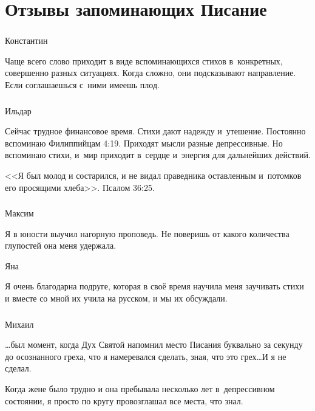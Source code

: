 \documentclass[t,aspectratio=169,14pt]{beamer}  %
\def\hy#1{\parbox{\linewidth}{#1}} %
\begin{document}
\section{Отзывы запоминающих Писание}
\begin{frame}[c]
	\frametitle{\insertsection}
	\framesubtitle{\insertsubsection}

	\begin{block}{Константин}
		\hy{Чаще всего слово приходит в виде вспоминающихся стихов в~конкретных, совершенно разных ситуациях. Когда сложно, они подсказывают направление. Если соглашаешься с~ними имеешь плод.}
	\end{block}
	
\end{frame}
\begin{frame}[c]
	\frametitle{\insertsection}
	\framesubtitle{\insertsubsection}

	\begin{block}{Ильдар}
		\hy{Сейчас трудное финансовое время. Стихи дают надежду и~утешение. Постоянно вспоминаю Филиппийцам 4:19. Приходят мысли разные депрессивные. Но вспоминаю стихи, и~мир приходит в~сердце и~энергия для дальнейших действий.}
		
		\vspace{6pt}
		
		\hy{<<Я был молод и состарился, и не видал праведника оставленным и~потомков его просящими хлеба>>. Псалом 36:25.}
	\end{block}
\end{frame}
\begin{frame}[c]
	\frametitle{\insertsection}
	\framesubtitle{\insertsubsection}

	\begin{block}{Максим}
		\hy{Я в юности выучил нагорную проповедь. Не поверишь от какого количества глупостей она меня удержала.}
	\end{block}
	\begin{block}{Яна}
	\hy{Я очень благодарна подруге, которая в своё время научила меня заучивать стихи и вместе со мной их учила на русском, и мы их обсуждали.}
	\end{block}
\end{frame}%
\begin{frame}[c]
	\frametitle{\insertsection}
	\framesubtitle{\insertsubsection}

	\begin{block}{Михаил}
		\hy{\ldots был момент, когда Дух Святой напомнил место Писания буквально за секунду до осознанного греха, что я намеревался сделать, зная, что это грех\ldots И я не сделал.}

		\vspace{6pt}

		\hy{Когда жене было трудно и она пребывала несколько лет в~депрессивном состоянии, я просто по кругу провозглашал все места, что знал.}
	\end{block}

\end{frame}
\end{document}
